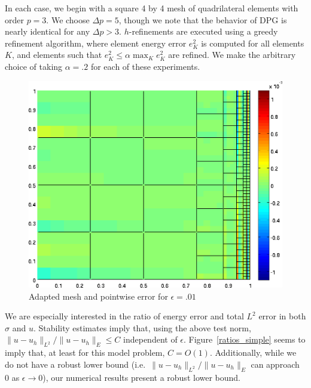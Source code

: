 \documentclass[11pt,onecolumn]{scrartcl}
\begin{document}
In each case, we begin with a square 4 by 4 mesh of quadrilateral elements with order $p=3$.  We choose $\Delta p = 5$, though we note that the behavior of DPG is nearly identical for any $\Delta p > 3$.  $h$-refinements are executed using a greedy refinement algorithm, where element energy error $e_K^2$ is computed for all elements $K$, and elements such that $e_K^2 \leq \alpha \max_K e_K^2$ are refined.  We make the arbitrary choice of taking $\alpha = .2$ for each of these experiments.  

\begin{figure}[h!]
\centering
\includegraphics[scale=.4]{figs/u_pointdiff_wallBC.png}
\caption{Adapted mesh and pointwise error for $\epsilon=.01$}
\end{figure}
We are especially interested in the ratio of energy error and total $L^2$ error in both $\sigma$ and $u$.  Stability estimates imply that, using the above test norm, $\|u-u_h\|_{L^2} / \|u-u_h\|_E \leq C$ independent of $\epsilon$.  Figure~\ref{ratios_simple} seems to imply that, at least for this model problem, $C=O(1)$.  Additionally, while we do not have a robust lower bound (i.e.\ $\|u-u_h\|_{L^2} / \|u-u_h\|_E$ can approach $0$ as $\epsilon \rightarrow 0$), our numerical results present a robust lower bound.  
\end{document}
